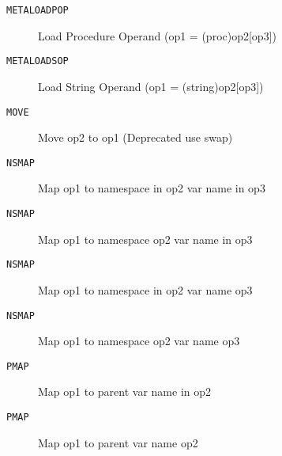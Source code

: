 \begin{description}
\item[\texttt{METALOADPOP}]        Load Procedure Operand (op1 = (proc)op2[op3])\\

\end{description}
\begin{description}
\item[\texttt{METALOADSOP}]        Load String Operand (op1 = (string)op2[op3])\\

\end{description}
\begin{description}
\item[\texttt{MOVE}]  Move op2 to op1 (Deprecated use swap)\\

\end{description}
\begin{description}
\item[\texttt{NSMAP}]  Map op1 to namespace in op2 var name in op3\\

\end{description}
\begin{description}
\item[\texttt{NSMAP}]  Map op1 to namespace op2 var name in op3\\

\end{description}
\begin{description}
\item[\texttt{NSMAP}]  Map op1 to namespace in op2 var name op3\\

\end{description}
\begin{description}
\item[\texttt{NSMAP}]  Map op1 to namespace op2 var name op3\\

\end{description}
\begin{description}
\item[\texttt{PMAP}]  Map op1 to parent var name in op2\\

\end{description}
\begin{description}
\item[\texttt{PMAP}]  Map op1 to parent var name op2\\

\end{description}
